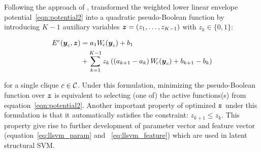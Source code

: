 \documentclass[sigconf, anonymous, review]{acmart}
\renewcommand{\citename}{\citet}
\begin{document}
Following the approach of \citename{Kohli:CVPR10},
\citename{Gould:ICML2011,gouldlearning} transformed the weighted
lower linear envelope potential~\eqref{eqn:potential2} into a
quadratic pseudo-Boolean function by introducing $K-1$ auxiliary
variables ${\boldsymbol{z}} = \left(z_1, \ldots, z_{K-1}\right)$ with $z_k\in
\{0,1\}$:

\begin{align}
  E^c({\boldsymbol{y}}_c, {\boldsymbol{z}}) &= a_1 W_{\!c}({\boldsymbol{y}}_c) + b_1 \notag \\
  &+ \sum_{k = 1}^{K-1} z_k \left( \left(a_{k+1} - a_k\right) W_{\!c}({\boldsymbol{y}}_c) + b_{k+1} - b_k \right)
  \label{eqn:binary_concave_z}
\end{align}

\noindent for a single clique $c \in \cal C$. Under this formulation,
minimizing the pseudo-Boolean function over ${\boldsymbol{z}}$ is equivalent
to selecting (one of) the active functions(s) from
equation~\eqref{eqn:potential2}. Another important property of
optimized ${\boldsymbol{z}}$ under this formulation is that it automatically
satisfies the constraint: $z_{k+1} \leq z_k$. This property give rise to further development of
parameter vector and feature
vector (equation~\eqref{eq:llsvm_param} and ~\eqref{eq:llsvm_feature})
which are used in latent
structural SVM.
\end{document}

